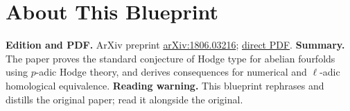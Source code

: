 

\chapter*{About This Blueprint}
\label{standard-conjectures-abelian-fourfolds-about}

\textbf{Edition and PDF.} ArXiv preprint \href{https://arxiv.org/abs/1806.03216}{arXiv:1806.03216};
\href{https://arxiv.org/pdf/1806.03216}{direct PDF}.
\textbf{Summary.} The paper proves the standard conjecture of Hodge type for abelian fourfolds using
$p$-adic Hodge theory, and derives consequences for numerical and $\ell$-adic homological equivalence.
\textbf{Reading warning.} This blueprint rephrases and distills the original paper; read it alongside the original.



















